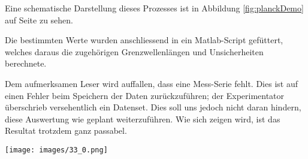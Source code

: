 Eine   schematische   Darstellung   dieses    Prozesses   ist   in   Abbildung
\ref{fig:planckDemo} auf Seite \pageref{fig:planckDemo} zu sehen.

Die bestimmten  Werte wurden  anschliessend in ein  Matlab-Script gef\"uttert,
welches  daraus  die   zugeh\"origen  Grenzwellenl\"angen  und  Unsicherheiten
berechnete.

Dem  aufmerksamen  Leser  wird  auffallen, dass  eine  Mess-Serie  fehlt. Dies
ist  auf  einen  Fehler  beim  Speichern  der  Daten  zur\"uckzuf\"uhren;  der
Experimentator \"uberschrieb versehentlich ein  Datenset. Dies soll uns jedoch
nicht daran  hindern, diese Auswertung wie  geplant weiterzuf\"uhren. Wie sich
zeigen wird, ist das Resultat trotzdem ganz passabel.

\begin{sidewaysfigure}[h!]
    \centering
    \texttt{[image: images/33\_0.png]}
    \caption{%
        Schematische    Darstellung    der   Bestimmung    der    Grenzwinkel.
        \textbf{Beachte:} Die     hier     eingezeichneten    Geraden     sind
        nicht     diejenigen,     welche     wirklich    zu     den     Werten
        aus     Tabelle     \ref{tab:resultsPlanckManualFit}     auf     Seite
        \pageref{tab:resultsPlanckManualFit}  gef\"uhrt haben. Dazu  ist diese
        Grafik viel  zu grob. Es  wurde pro  Spannung jeweils  ein Scatterplot
        ausgewertet, um  die zugeh\"origen  Grenzwinkel zu  bestimmen. Da dies
        jedoch  unverh\"altnism\"assig  viel  Platz  ben\"otigt  f\"ur  diesen
        Bericht, ist das Vorgehen schematisch hier dargestellt.
    }
    \label{fig:planckDemo}
\end{sidewaysfigure}

